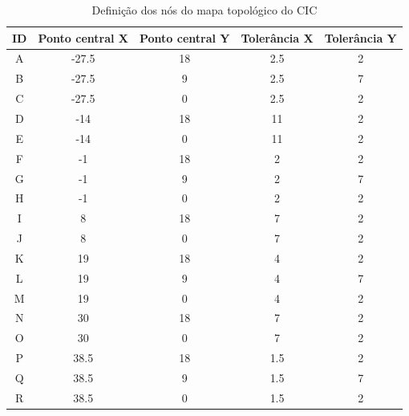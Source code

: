 \documentclass{llncs}
\begin{document}
\begin{table}[]
\centering
\caption{Definição dos nós do mapa topológico do CIC}
\label{node-table}
\begin{tabular}{|c|c|c|c|c|}
\hline
ID & Ponto central X & Ponto central Y & Tolerância X & Tolerância Y \\ \hline
A & -27.5 & 18 & 2.5 & 2 \\ \hline
B & -27.5 & 9 & 2.5 & 7 \\ \hline
C & -27.5 & 0 & 2.5 & 2 \\ \hline
D & -14 & 18 & 11 & 2 \\ \hline
E & -14 & 0 & 11 & 2 \\ \hline
F & -1 & 18 & 2 & 2 \\ \hline
G & -1 & 9 & 2 & 7 \\ \hline
H & -1 & 0 & 2 & 2 \\ \hline
I & 8 & 18 & 7 & 2 \\ \hline
J & 8 & 0 & 7 & 2 \\ \hline
K & 19 & 18 & 4 & 2 \\ \hline
L & 19 & 9 & 4 & 7 \\ \hline
M & 19 & 0 & 4 & 2 \\ \hline
N & 30 & 18 & 7 & 2 \\ \hline
O & 30 & 0 & 7 & 2 \\ \hline
P & 38.5 & 18 & 1.5 & 2 \\ \hline
Q & 38.5 & 9 & 1.5 & 7 \\ \hline
R & 38.5 & 0 & 1.5 & 2 \\ \hline
\end{tabular}
\end{table}
\end{document}
